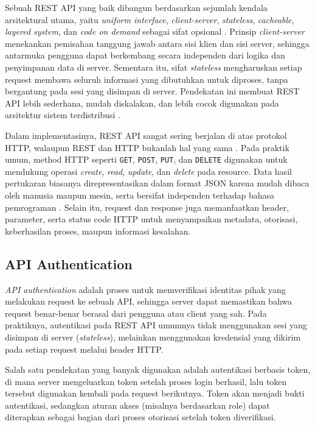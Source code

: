 \documentclass[a4paper,oneside,11pt]{book}
\begin{document}
\par Sebuah REST API yang baik dibangun berdasarkan sejumlah kendala arsitektural utama, yaitu \textit{uniform interface}, \textit{client-server}, \textit{stateless}, \textit{cacheable}, \textit{layered system}, dan \textit{code on demand} sebagai sifat opsional \cite{ibm-rest-api,restfulapi-rest}. Prinsip \textit{client-server} menekankan pemisahan tanggung jawab antara sisi klien dan sisi server, sehingga antarmuka pengguna dapat berkembang secara independen dari logika dan penyimpanan data di server. Sementara itu, sifat \textit{stateless} mengharuskan setiap request membawa seluruh informasi yang dibutuhkan untuk diproses, tanpa bergantung pada sesi yang disimpan di server. Pendekatan ini membuat REST API lebih sederhana, mudah diskalakan, dan lebih cocok digunakan pada arsitektur sistem terdistribusi \cite{ibm-rest-api,restfulapi-rest}.

\par Dalam implementasinya, REST API sangat sering berjalan di atas protokol HTTP, walaupun REST dan HTTP bukanlah hal yang sama \cite{restfulapi-rest}. Pada praktik umum, method HTTP seperti \texttt{GET}, \texttt{POST}, \texttt{PUT}, dan \texttt{DELETE} digunakan untuk mendukung operasi \textit{create}, \textit{read}, \textit{update}, dan \textit{delete} pada resource. Data hasil pertukaran biasanya direpresentasikan dalam format JSON karena mudah dibaca oleh manusia maupun mesin, serta bersifat independen terhadap bahasa pemrograman \cite{ibm-rest-api}. Selain itu, request dan response juga memanfaatkan header, parameter, serta status code HTTP untuk menyampaikan metadata, otorisasi, keberhasilan proses, maupun informasi kesalahan.

\subsection{API Authentication}

\par \textit{API authentication} adalah proses untuk memverifikasi identitas pihak yang melakukan request ke sebuah API, sehingga server dapat memastikan bahwa request benar-benar berasal dari pengguna atau client yang sah. Pada praktiknya, autentikasi pada REST API umumnya tidak menggunakan sesi yang disimpan di server (\textit{stateless}), melainkan menggunakan kredensial yang dikirim pada setiap request melalui header HTTP.

\par Salah satu pendekatan yang banyak digunakan adalah autentikasi berbasis token, di mana server mengeluarkan token setelah proses login berhasil, lalu token tersebut digunakan kembali pada request berikutnya. Token akan menjadi bukti autentikasi, sedangkan aturan akses (misalnya berdasarkan role) dapat diterapkan sebagai bagian dari proses otorisasi setelah token diverifikasi.
\end{document}
